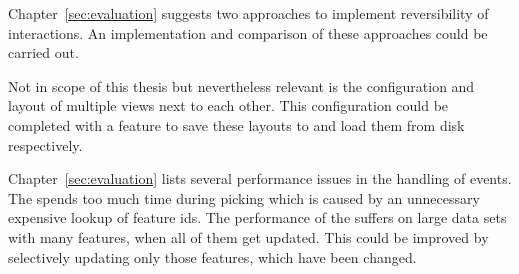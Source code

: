 Chapter~\ref{sec:evaluation} suggests two approaches to implement reversibility of interactions.
An implementation and comparison of these approaches could be carried out.

Not in scope of this thesis but nevertheless relevant is the configuration and layout of multiple views next to each other.
This configuration could be completed with a feature to save these layouts to and load them from disk respectively.

Chapter~\ref{sec:evaluation} lists several performance issues in the handling of  events.
The \tmap{} spends too much time during picking which is caused by an unnecessary expensive lookup of feature ids.
The performance of the \gv{} suffers on large data sets with many features, when all of them get updated.
This could be improved by selectively updating only those features, which have been changed.





